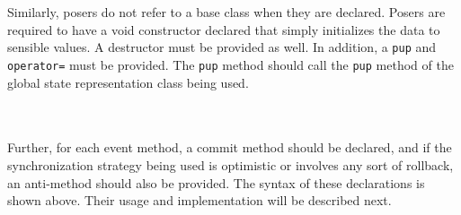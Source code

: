 \documentclass[10pt]{article}
\begin{document}
~\\
\\

Similarly, posers do not refer to a base class when they are
declared.  Posers are required to have a void constructor declared
that simply initializes the data to sensible values.  A destructor
must be provided as well.  In addition, a {\tt pup} and {\tt
operator=} must be provided.  The {\tt pup} method should call the
{\tt pup} method of the global state representation class being used.

~\\
\\

Further, for each event method, a commit method should be declared,
and if the synchronization strategy being used is optimistic or
involves any sort of rollback, an anti-method should also be provided.
The syntax of these declarations is shown above.  Their usage and
implementation will be described next.
\end{document}
